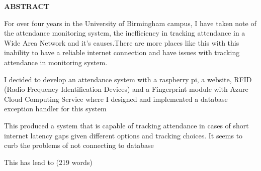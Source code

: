 \providecommand\phantomsection{} \phantomsection
\begin{center}
\providecommand\pdfbookmark[3][]{} \pdfbookmark[0]{Abstract}{bm:Abstract}
\vspace*{1in}
\textbf{ABSTRACT}\\[2\baselineskip]
\end{center}

For over four years in the University of Birmingham campus, I  have taken note of the attendance monitoring system, the inefficiency in tracking attendance  in a Wide Area Network and it's causes.There are more places like this with this inability to have a reliable internet connection and have issues with tracking attendance in monitoring system.

I decided to develop an attendance system with a raspberry pi, a website, RFID (Radio Frequency Identification Devices) and a Fingerprint module with Azure Cloud Computing Service where I designed and implemented a database exception handler for this system 

This produced a system that is capable of tracking attendance in cases of short internet latency gaps given different options and tracking choices. It seems to curb the problems of not connecting to database 

This has lead to (219 words)

